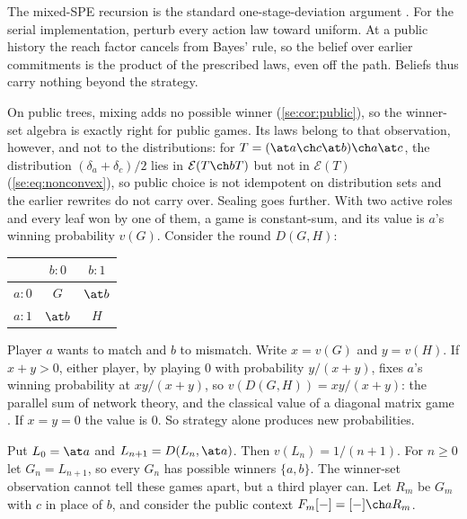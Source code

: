 \begin{idea}
The mixed-SPE recursion is the standard one-stage-deviation argument \cite{FudenbergTirole1991}. For the serial implementation, perturb every action law toward uniform. At a public history the reach factor cancels from Bayes' rule, so the belief over earlier commitments is the product of the prescribed laws, even off the path. Beliefs thus carry nothing
beyond the strategy.
\end{idea}

On public trees, mixing adds no possible winner (\cref{se:cor:public}), so the winner-set algebra is exactly right for public games. Its laws belong to that observation, however, and not to the distributions: for $T=(\at a\ch c\at b)\ch a\at c$, the distribution $(\delta_a+\delta_c)/2$ lies in $\mathcal E(T\ch b T)$ but not in $\mathcal E(T)$ (\cref{se:eq:nonconvex}), so public choice is not idempotent on distribution sets and the earlier rewrites do not carry over. Sealing goes further. With two active roles and every leaf won by one of them, a game is constant-sum, and its value is $a$'s winning probability $v(G)$. Consider the round $D(G,H)$:
\begin{center}
\begin{tabular}{c|cc}
 & $b:0$ & $b:1$\\\hline
$a:0$ & $G$ & $\at b$\\
$a:1$ & $\at b$ & $H$
\end{tabular}
\end{center}
Player $a$ wants to match and $b$ to mismatch. Write $x=v(G)$ and $y=v(H)$. If $x+y>0$, either player, by playing $0$ with probability $y/(x+y)$, fixes $a$'s winning probability at $xy/(x+y)$, so $v(D(G,H))=xy/(x+y)$: the parallel sum of network theory, and the classical value of a diagonal matrix game \cite{AndersonDuffin1969,FergusonNotes}. If $x=y=0$ the value is $0$. So strategy alone produces new probabilities.

Put $L_0=\at a$ and $L_{n+1}=D(L_n,\at a)$. Then $v(L_n)=1/(n+1)$. For $n\geq0$ let $G_n=L_{n+1}$, so every $G_n$ has possible winners $\{a,b\}$. The winner-set observation cannot tell these games apart, but a third player can. Let $R_m$ be $G_m$ with $c$ in place of $b$, and consider the public context $F_m[-]=[-]\ch a R_m$.


